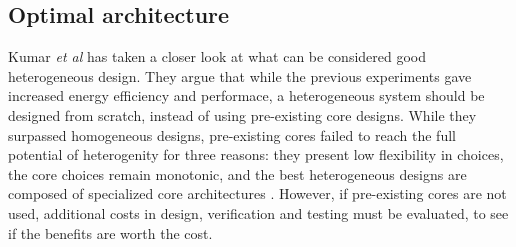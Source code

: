 \subsection{Optimal architecture}
\label{subsec:rw_arch}
Kumar \textit{et al}\cite{heterogeneous-arch} has taken a closer look at what can be considered good heterogeneous design.
They argue that while the previous experiments gave increased energy efficiency and performace, a heterogeneous system should be designed from scratch, instead of using pre-existing core designs.
While they surpassed homogeneous designs, pre-existing cores failed to reach the full potential of heterogenity for three reasons: they present low flexibility in choices, the core choices remain monotonic, and the best heterogeneous designs are composed of specialized core architectures \cite{heterogeneous-arch}.
However, if pre-existing cores are not used, additional costs in design, verification and testing must be evaluated, to see if the benefits are worth the cost.



